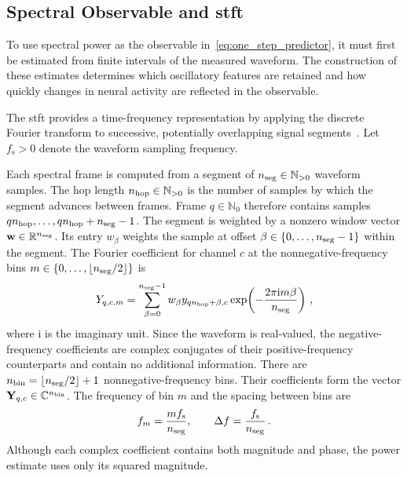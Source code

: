 \subsection{Spectral Observable and \acs{stft}}\label{sec:spectral_representation}

To use spectral power as the observable in~\eqref{eq:one_step_predictor}, it must first be estimated from finite intervals of the measured waveform.
The construction of these estimates determines which oscillatory features are retained and how quickly changes in neural activity are reflected in the observable.

The \ac{stft} provides a time-frequency representation by applying the discrete Fourier transform to successive, potentially overlapping signal segments~\cite{Oppenheim2010}.
Let $f_\mathrm{s}>0$ denote the waveform sampling frequency.

Each spectral frame is computed from a segment of $n_{\mathrm{seg}}{}\in\mathbb N_{>0}$ waveform samples.
The hop length $n_{\mathrm{hop}}{}\in\mathbb N_{>0}$ is the number of samples by which the segment advances between frames.
Frame $q\in\mathbb N_0$ therefore contains samples $qn_{\mathrm{hop}}{},\ldots,qn_{\mathrm{hop}}{}+n_{\mathrm{seg}}{}-1$.
The segment is weighted by a nonzero window vector $\mathbf w\in\mathbb R^{n_{\mathrm{seg}}{}}$.
Its entry $w_\beta$ weights the sample at offset $\beta\in\{0,\ldots,n_{\mathrm{seg}}{}-1\}$ within the segment.
The Fourier coefficient for channel $c$ at the nonnegative-frequency bins $m\in\{0,\ldots,\lfloor n_{\mathrm{seg}}{}/2\rfloor\}$ is
\begin{equation}
    Y_{q,c,m}
    =\sum_{\beta=0}^{n_{\mathrm{seg}}{}-1}w_\beta
    y_{q n_{\mathrm{hop}}{}+\beta,c}
    \exp\!\left(-\frac{2\pi\mathrm{i}m\beta}{n_{\mathrm{seg}}{}}\right)\,,
\end{equation}
where $\mathrm{i}$ is the imaginary unit.
Since the waveform is real-valued, the negative-frequency coefficients are complex conjugates of their positive-frequency counterparts and contain no additional information.
There are $n_{\mathrm{bin}}{}=\lfloor n_{\mathrm{seg}}{}/2\rfloor+1$ nonnegative-frequency bins.
Their coefficients form the vector $\mathbf{Y}_{q,c}\in\mathbb{C}^{n_{\mathrm{bin}}{}}$.
The frequency of bin $m$ and the spacing between bins are
\begin{equation*}
    f_m=\frac{mf_\mathrm{s}}{n_{\mathrm{seg}}{}},
    \qquad
    \Delta f=\frac{f_\mathrm{s}}{n_{\mathrm{seg}}{}}\,.
\end{equation*}
Although each complex coefficient contains both magnitude and phase, the power estimate uses only its squared magnitude.

